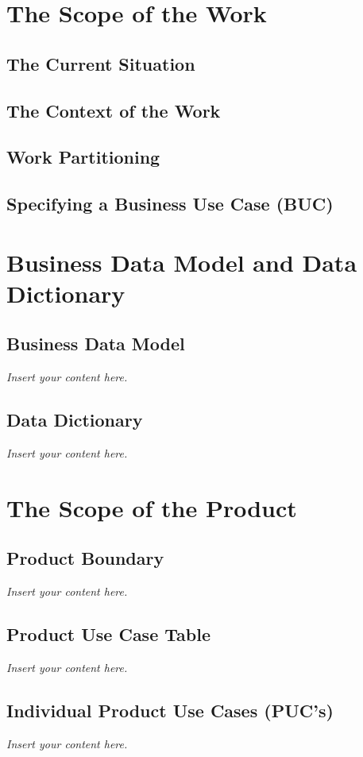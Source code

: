 \documentclass[12pt]{article}
\newcommand{\lips}{\textit{Insert your content here.}}
\begin{document}
\section{The Scope of the Work}
\subsection{The Current Situation}
\subsection{The Context of the Work}

\subsection{Work Partitioning}



\subsection{Specifying a Business Use Case (BUC)}

\section{Business Data Model and Data Dictionary}
\subsection{Business Data Model}
\lips
\subsection{Data Dictionary}
\lips

\section{The Scope of the Product}
\subsection{Product Boundary}
\lips
\subsection{Product Use Case Table}
\lips
\subsection{Individual Product Use Cases (PUC's)}
\lips
\end{document}
